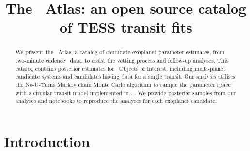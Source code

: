 \documentclass[floatfix,ApJL,twocolumn]{aastex631}
\begin{document}
\title{The \tess\ Atlas: an open source catalog of TESS transit fits}







\begin{abstract}
We present the \tess\ Atlas, a catalog of candidate exoplanet parameter estimates, from two-minute cadence \tess\  data, to assist the vetting process and follow-up analyses.
This catalog contains posterior estimates for \red{\numAnalysed} \tess\ Objects of Interest, including \red{\numAnalysedMulti} multi-planet candidate systems and \red{\numAnalysedSingle} candidates having data for a single transit.
Our analysis utilises the No-U-Turns Markov chain Monte Carlo algorithm to sample the parameter space with a circular transit model implemented in \exoplanet.
.
We provide posterior samples from our analyses and \jupyter notebooks to reproduce the analyses for each exoplanet candidate.
\end{abstract}




\section{Introduction} \label{sec:intro}
\end{document}

